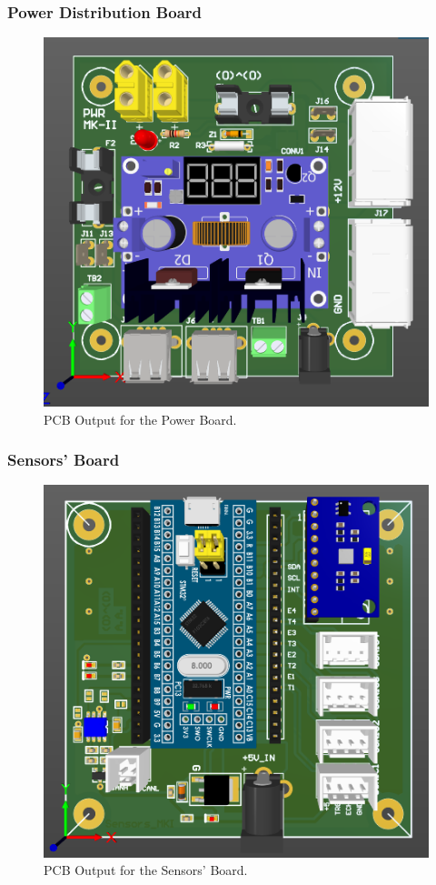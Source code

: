 \subsubsection{Power Distribution Board}
\begin{figure}[h!]
	\centering
	\includegraphics[scale=0.1]{Figures/HW/pcb-power.png}
	\caption{PCB Output for the Power Board. }
	\label{fig:hw-pwr-pcb}
\end{figure}

\newpage
\subsubsection{Sensors' Board}
\begin{figure}[h!]
	\centering
	\includegraphics[scale=0.1]{Figures/HW/pcb-sensi-boi.png}
	\caption{PCB Output for the Sensors' Board. }
	\label{fig:hw-sense-pcb}
\end{figure}

